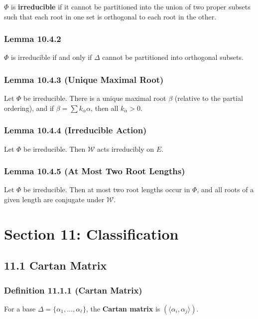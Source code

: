 $\Phi$ is \textbf{irreducible} if it cannot be partitioned into the union of two proper subsets such that each root in one set is orthogonal to each root in the other.

\subsubsection{Lemma 10.4.2}

$\Phi$ is irreducible if and only if $\Delta$ cannot be partitioned into orthogonal subsets.

\subsubsection{Lemma 10.4.3 (Unique Maximal Root)}

Let $\Phi$ be irreducible. There is a unique maximal root $\beta$ (relative to the partial ordering), and if $\beta = \sum k_\alpha \alpha$, then all $k_\alpha > 0$.

\subsubsection{Lemma 10.4.4 (Irreducible Action)}

Let $\Phi$ be irreducible. Then $\mathcal{W}$ acts irreducibly on $E$.

\subsubsection{Lemma 10.4.5 (At Most Two Root Lengths)}

Let $\Phi$ be irreducible. Then at most two root lengths occur in $\Phi$, and all roots of a given length are conjugate under $\mathcal{W}$.


\section{Section 11: Classification}

\subsection{11.1 Cartan Matrix}

\subsubsection{Definition 11.1.1 (Cartan Matrix)}

For a base $\Delta = \{\alpha_1, \ldots, \alpha_\ell\}$, the \textbf{Cartan matrix} is $(\langle\alpha_i, \alpha_j\rangle)$.

